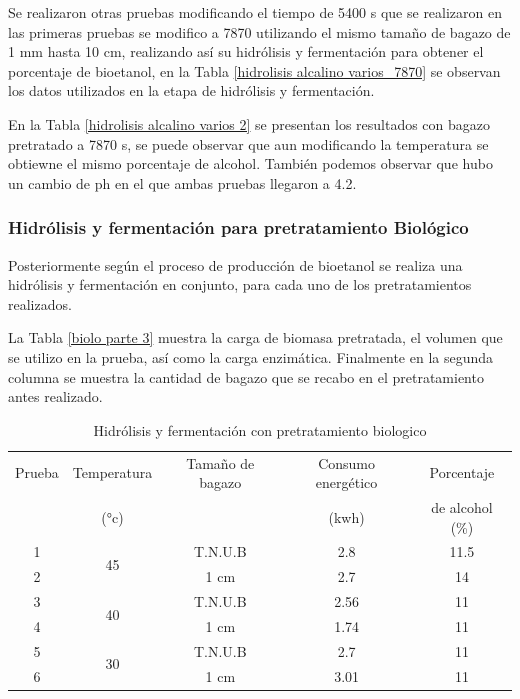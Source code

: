 \documentclass[12pt]{article}
\begin{document}
	Se realizaron otras pruebas modificando el tiempo de 5400 s que se realizaron en las primeras pruebas se modifico a 7870 utilizando el mismo tamaño de bagazo de 1 mm hasta 10 cm, realizando así su hidrólisis y fermentación para obtener el porcentaje de bioetanol, en la Tabla \ref{hidrolisis alcalino varios_7870}  se observan los datos utilizados en la etapa de hidrólisis y fermentación.
	
	
	

	
	
	En la Tabla \ref{hidrolisis alcalino varios 2} se presentan los resultados con bagazo pretratado a 7870 s, se puede observar que aun modificando la temperatura se obtiewne el mismo porcentaje de alcohol. También podemos observar que hubo un cambio de ph en el que ambas pruebas llegaron a 4.2.
	
	
	
			
   	\subsubsection{ Hidrólisis y fermentación para pretratamiento Biológico}
   
   Posteriormente según el proceso de producción de bioetanol se realiza una hidrólisis y fermentación en conjunto, para cada uno de los pretratamientos realizados.
   


  La Tabla \ref{biolo parte 3} muestra la carga de biomasa pretratada, el volumen que se utilizo en la prueba, así como la carga enzimática. Finalmente en la segunda columna se muestra la cantidad de bagazo que se recabo en el pretratamiento antes realizado. 

 	\begin{table}[!ht]
 		\centering
 		\caption{Hidrólisis y fermentación con pretratamiento biologico}
 		\begin{tabular}{|c|c|c|c|c|}
 			\hline
 			Prueba & Temperatura  & Tamaño de bagazo & Consumo energético  & Porcentaje \\ 
 			&(°c)&&(kwh)&de alcohol (\%)\\ \hline
 			1 & \multirow{2}{*}{45} & T.N.U.B & 2.8 & 11.5 \\ \cline{1-1} \cline{3-5}
 			2 &  & 1 cm & 2.7  & 14 \\ \hline
 			3 & \multirow{2}{*}{40} & T.N.U.B &  2.56 & 11 \\ \cline{1-1} \cline{3-5}
 			4 &  & 1 cm & 1.74  & 11 \\  \hline
 			5 & \multirow{2}{*}{30} & T.N.U.B & 2.7 & 11 \\ \cline{1-1} \cline{3-5}
 			6 &  & 1 cm & 3.01 & 11 \\ \hline
 		\end{tabular}
 		\label{ssf Pretratamiento Biológico}
 	\end{table}
 	
\end{document}
